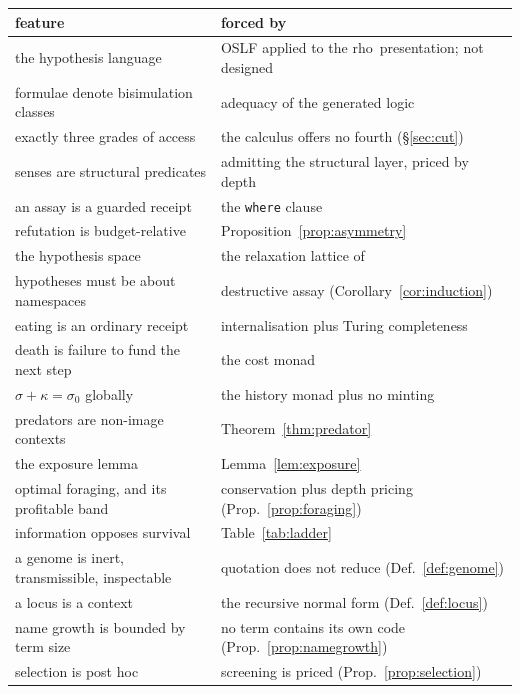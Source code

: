 \documentclass[11pt]{article}
\theoremstyle{plain}
\theoremstyle{definition}
\newcommand{\rhoc}{\textsf{rho}}
\begin{document}
\begin{table}[h]
\centering
\begin{tabular}{@{}p{}p{}@{}}
\toprule
\textbf{feature} & \textbf{forced by} \\
\midrule
the hypothesis language & OSLF applied to the \rhoc\ presentation; not designed \\
formulae denote bisimulation classes & adequacy of the generated logic \\
exactly three grades of access & the calculus offers no fourth (\S\ref{sec:cut}) \\
senses are structural predicates & admitting the structural layer, priced by depth \\
an assay is a guarded receipt & the \texttt{where} clause \\
refutation is budget-relative & Proposition~\ref{prop:asymmetry} \\
the hypothesis space & the relaxation lattice of \cite{ClassifierNote} \\
hypotheses must be about namespaces & destructive assay (Corollary~\ref{cor:induction}) \\
eating is an ordinary receipt & internalisation plus Turing completeness \\
death is failure to fund the next step & the cost monad \\
$\sigma + \kappa = \sigma_0$ globally & the history monad plus no minting \\
predators are non-image contexts & Theorem~\ref{thm:predator} \\
the exposure lemma & Lemma~\ref{lem:exposure} \\
optimal foraging, and its profitable band & conservation plus depth pricing
(Prop.~\ref{prop:foraging}) \\
information opposes survival & Table~\ref{tab:ladder} \\
a genome is inert, transmissible, inspectable & quotation does not reduce
(Def.~\ref{def:genome}) \\
a locus is a context & the recursive normal form (Def.~\ref{def:locus}) \\
name growth is bounded by term size & no term contains its own code
(Prop.~\ref{prop:namegrowth}) \\
selection is post hoc & screening is priced (Prop.~\ref{prop:selection}) \\
\bottomrule
\end{tabular}
\end{table}
\end{document}
